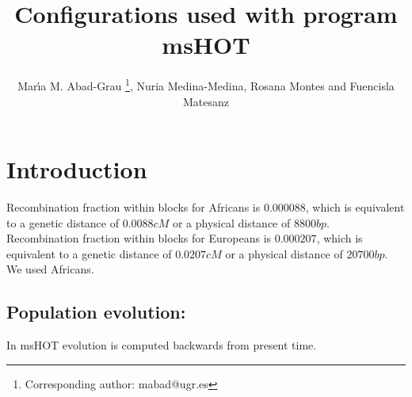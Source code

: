 \documentclass[runningheads]{/home/mabad/conferences/LNCS/llncs}
\begin{document}
\mainmatter 


\title{Configurations used with program msHOT}





\author{Mar\'{\i}a M. Abad-Grau
\thanks{Corresponding author: mabad@ugr.es}, Nuria Medina-Medina, Rosana Montes and Fuencisla Matesanz }
%





\date{}

\maketitle


\section{Introduction}\label{sec:introduction}

Recombination fraction within blocks for Africans is $0.000088$, which is equivalent to a genetic distance of $0.0088 cM$ or a physical distance of $8800 bp$. Recombination fraction within blocks for Europeans is $0.000207$, which is equivalent to a genetic distance of $0.0207 cM$ or a physical distance of $20700 bp$. We used Africans. 

\subsection{Population evolution:}
In msHOT evolution is computed backwards from present time.
\end{document}
